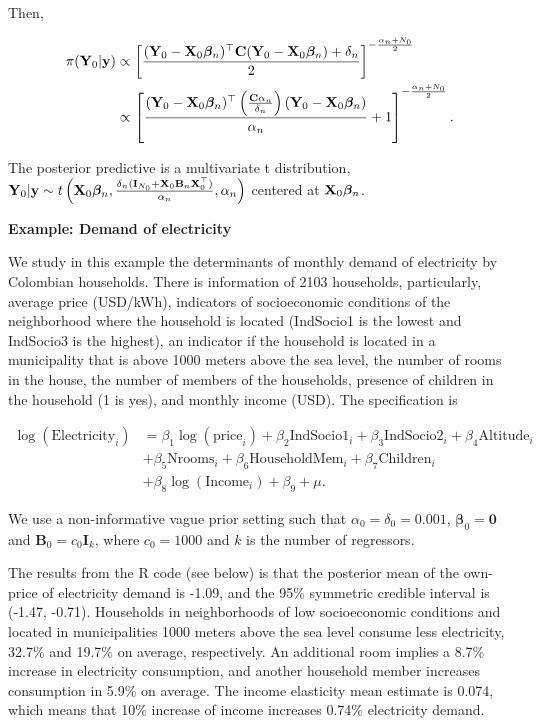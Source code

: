 Then,

\begin{align*}
	\pi({\bf{Y}}_0|{\bf{y}})&\propto\left[\frac{({\bf{Y}}_0-{\mathbf{X}}_0\bm{\beta}_n)^{\top}{\bf{C}}({\bf{Y}}_0-{\mathbf{X}}_0\bm{\beta}_n)+\delta_n}{2}\right]^{-\frac{\alpha_n+N_0}{2}}\\
	&\propto\left[\frac{({\bf{Y}}_0-{\mathbf{X}}_0\bm{\beta}_n)^{\top}\left(\frac{{\bf{C}}\alpha_n}{\delta_n}\right)({\bf{Y}}_0-{\mathbf{X}}_0\bm{\beta}_n)}{\alpha_n}+1\right]^{-\frac{\alpha_n+N_0}{2}}.
\end{align*}

The posterior predictive is a multivariate t distribution, ${\bf{Y}}_0|{\bf{y}}\sim t\left({\bf{X}}_0\bm{\beta}_n,\frac{\delta_n({\bf{I}}_{N_0}+{\bf{X}}_0{\bf{B}}_n{\bf{X}}_0^{\top})}{\alpha_n},\alpha_n\right)$ centered at ${\bf{X}}_0\bm{\beta}_n$.

\textbf{Example: Demand of electricity}

We study in this example the determinants of monthly demand of electricity by Colombian households. There is information of 2103 households, particularly, average price (USD/kWh), indicators of socioeconomic conditions of the neighborhood where the household is located (IndSocio1 is the lowest and IndSocio3 is the highest), an indicator if the household is located in a municipality that is above 1000 meters above the sea level, the number of rooms in the house, the number of members of the households, presence of children in the household (1 is yes), and monthly income (USD). The specification is

\begin{align*}
	\log(\text{Electricity}_i) & = \beta_1\log(\text{price}_i) + \beta_2\text{IndSocio1}_i + \beta_3\text{IndSocio2}_i + \beta_4\text{Altitude}_i \\
	& + \beta_5\text{Nrooms}_i + \beta_6\text{HouseholdMem}_i + \beta_7\text{Children}_i\\
	& + \beta_8\log(\text{Income}_i) + \beta_9 + \mu.
\end{align*}

We use a non-informative vague prior setting such that $\alpha_0=\delta_0=0.001$, $\bm{\beta}_0=\mathbf{0}$ and $\mathbf{B}_0=c_0\mathbf{I}_k$, where $c_0=1000$ and $k$ is the number of regressors. 

The results from the R code (see below) is that the posterior mean of the own-price of electricity demand is -1.09, and the 95\% symmetric credible interval is (-1.47, -0.71). Households in neighborhoods of low socioeconomic conditions and located in municipalities 1000 meters above the sea level consume less electricity, 32.7\% and 19.7\% on average, respectively. An additional room implies a 8.7\% increase in electricity consumption, and another household member increases consumption in 5.9\% on average. The income elasticity mean estimate is 0.074, which means that 10\% increase of income increases 0.74\% electricity demand.

